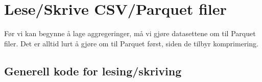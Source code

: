 \section{Lese/Skrive CSV/Parquet filer}

Før vi kan begynne å lage aggregeringer, må vi gjøre datasettene om til Parquet filer. Det er alltid lurt å gjøre om til Parquet først, siden de tilbyr komprimering.

\subsection{Generell kode for lesing/skriving}
